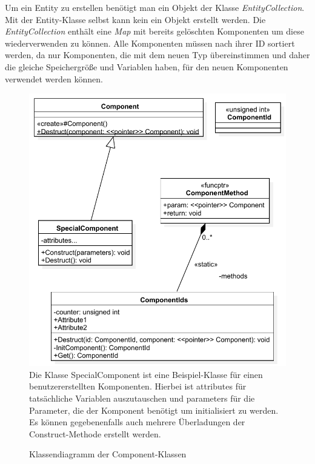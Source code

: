 Um ein Entity zu erstellen benötigt man ein Objekt der Klasse \textit{EntityCollection}. Mit der Entity-Klasse selbst kann kein ein Objekt erstellt werden.  
Die \textit{EntityCollection} enthält eine \textit{Map} mit bereits gelöschten Komponenten um diese wiederverwenden zu können. 
Alle Komponenten müssen nach ihrer ID sortiert werden, da nur Komponenten, die mit dem neuen Typ übereinstimmen und daher die gleiche Speichergröße und Variablen haben, für den neuen Komponenten verwendet werden können.

\begin{figure}
	\begin{center}
		\includegraphics[width=\textwidth]{03unserprogramm/Engine/SpecialComponent.pdf}
		Die Klasse SpecialComponent ist eine Beispiel-Klasse für einen benutzererstellten Komponenten. Hierbei ist attributes für tatsächliche Variablen auszutauschen und parameters für die Parameter, die der Komponent benötigt um initialisiert zu werden. Es können gegebenenfalls auch mehrere Überladungen der Construct-Methode erstellt werden.
		\caption{Klassendiagramm der Component-Klassen}\label{ClassDiagramComponents}
	\end{center}
\end{figure}

